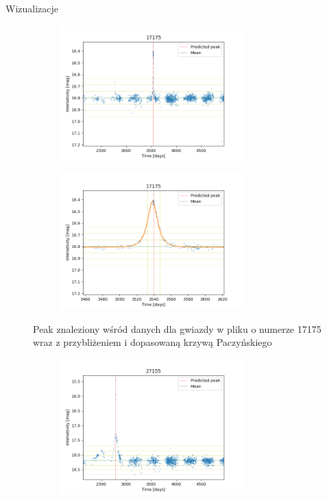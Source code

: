 \documentclass[a4paper,11pt]{article}
\begin{document}
\begin{subsection}{Wizualizacje}
\begin{figure}[H]
\end{figure}
\begin{figure}[H]
\begin{subfigure}{0.5\textwidth}
\centering
\includegraphics[width=\linewidth,height=5.25cm]{17175.png}
\label{Fig_6}
\end{subfigure}
\begin{subfigure}{0.5\textwidth}
\centering
\includegraphics[width=\linewidth,height=5.25cm]{17175_v.png}
\label{Fig_7}
\end{subfigure}
\caption{Peak znaleziony wśród danych dla gwiazdy w pliku o numerze 17175 wraz z przybliżeniem i dopasowaną krzywą Paczyńskiego}
\end{figure}
\begin{figure}[H]
\begin{subfigure}{0.5\textwidth}
\centering
\includegraphics[width=\linewidth,height=5.25cm]{27155.png}
\label{Fig_8}
\end{subfigure}
\begin{subfigure}{0.5\textwidth}

\end{subfigure}
\end{figure}
\end{subsection}
\end{document}
